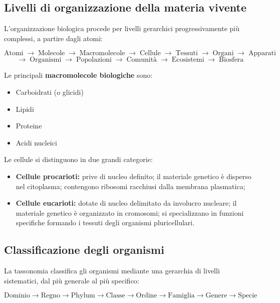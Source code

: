 \documentclass[11pt,a4paper,openright,twoside]{book}
\theoremstyle{definition}
\theoremstyle{plain}
\theoremstyle{remark}
\begin{document}
\subsection{Livelli di organizzazione della materia vivente}

L'organizzazione biologica procede per livelli gerarchici progressivamente più complessi, a partire dagli atomi:

\[
\text{Atomi} \;\to\; \text{Molecole} \;\to\; \text{Macromolecole} \;\to\; \text{Cellule} \;\to\; \text{Tessuti} \;\to\; \text{Organi} \;\to\; \text{Apparati}
\]
\[
\to\; \text{Organismi} \;\to\; \text{Popolazioni} \;\to\; \text{Comunità} \;\to\; \text{Ecosistemi} \;\to\; \text{Biosfera}
\]

Le principali \textbf{macromolecole biologiche} sono:
\begin{itemize}
  \item Carboidrati (o glicidi)
  \item Lipidi
  \item Proteine
  \item Acidi nucleici
\end{itemize}

Le cellule si distinguono in due grandi categorie:
\begin{itemize}
  \item \textbf{Cellule procarioti:} prive di nucleo definito; il materiale genetico è disperso nel citoplasma; contengono ribosomi racchiusi dalla membrana plasmatica;
  \item \textbf{Cellule eucarioti:} dotate di nucleo delimitato da involucro nucleare; il materiale genetico è organizzato in cromosomi; si specializzano in funzioni specifiche formando i tessuti degli organismi pluricellulari.
\end{itemize}

\subsection{Classificazione degli organismi}

La tassonomia classifica gli organismi mediante una gerarchia di livelli sistematici, dal più generale al più specifico:

\[
\text{Dominio} \to \text{Regno} \to \text{Phylum} \to \text{Classe} \to \text{Ordine} \to \text{Famiglia} \to \text{Genere} \to \text{Specie}
\]
\end{document}
